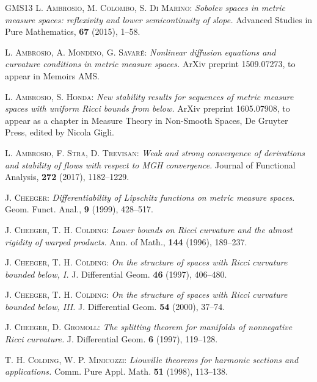 \documentclass[a4paper,11pt,reqno]{article}
\numberwithin{equation}{section}
\theoremstyle{plain}
\theoremstyle{definition}
\theoremstyle{remark}
\begin{document}
{\begin{thebibliography}{GMS13}
      \textsc{L. Ambrosio, M. Colombo, S. Di Marino}:
      \textit{Sobolev spaces in metric measure spaces: reflexivity and lower semicontinuity of slope.}
      Advanced Studies in Pure Mathematics, {\bf 67} (2015), 1--58.

        \textsc{L. Ambrosio, A. Mondino, G. Savar\'e}:
\textit{Nonlinear diffusion equations and curvature conditions in metric measure spaces.}
ArXiv preprint 1509.07273, to appear in Memoirs AMS.

	\textsc{L. Ambrosio, S. Honda}:
	\textit{New stability results for sequences of metric measure spaces with uniform Ricci bounds from below.}
	ArXiv preprint 1605.07908, to appear as a chapter in Measure Theory in Non-Smooth Spaces, De Gruyter Press, edited by Nicola Gigli.

        \textsc{L. Ambrosio, F. Stra, D. Trevisan}: 
        \textit{Weak and strong convergence of derivations and stability of flows with respect to MGH convergence.}
        Journal of Functional Analysis, {\bf 272} (2017), 1182--1229.
    
         \textsc{J. Cheeger}: \textit{Differentiability of Lipschitz functions on metric measure spaces}. 
         Geom. Funct. Anal., \textbf{9} (1999), 428--517.
 
          \textsc{J. Cheeger, T. H. Colding}:
          \textit{Lower bounds on Ricci curvature and the almost rigidity of
warped products.}  Ann. of Math., \textbf{144} (1996), 189--237.

          \textsc{J. Cheeger, T. H. Colding}:
          \textit{On the structure of spaces with Ricci curvature bounded below, I.}  J. Differential Geom. \textbf{46} (1997), 406--480.
  
          \textsc{J. Cheeger, T. H. Colding}:
          \textit{On the structure of spaces with Ricci curvature bounded below, III.}  J. Differential Geom. \textbf{54} (2000), 37--74.

          \textsc{J. Cheeger, D. Gromoll}:
          \textit{The splitting theorem for manifolds of nonnegative Ricci curvature.}  J. Differential Geom. \textbf{6} (1997), 119--128.
          
          \textsc{T. H. Colding, W. P. Minicozzi}:
          \textit{Liouville theorems for harmonic sections and applications.}  Comm. Pure Appl. Math. \textbf{51} (1998), 113--138.
 

\end{thebibliography}}
\end{document}
